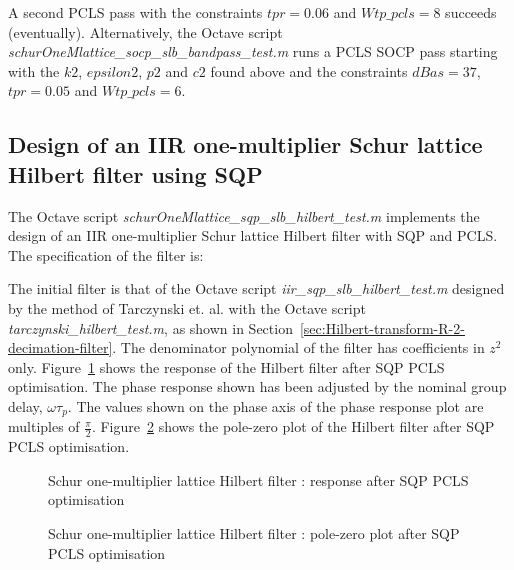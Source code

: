 \documentclass[a4paper,twoside,10pt,english]{report}
\begin{document}
A second PCLS pass with the constraints $tpr=0.06$ and $Wtp\_pcls=8$ succeeds 
(eventually). Alternatively, the Octave script  
\emph{schurOneMlattice\_socp\_slb\_bandpass\_test.m} runs a PCLS SOCP pass 
starting with the $k2$, $epsilon2$, $p2$ and $c2$ found above and the 
constraints $dBas=37$, $tpr=0.05$ and $Wtp\_pcls=6$.
\clearpage
\subsection{\label{sec:Design-IIR-one-multiplier-Schur-lattice-hilbert-SQP}Design of an IIR one-multiplier Schur lattice Hilbert filter using SQP}
The Octave script \emph{schurOneMlattice\_sqp\_slb\_hilbert\_test.m} implements
the design of an IIR one-multiplier Schur lattice Hilbert filter with SQP and 
PCLS. The specification of the filter is:
\begin{small}

\end{small}
The initial filter is that of the Octave script 
\emph{iir\_sqp\_slb\_hilbert\_test.m} designed by
the method of Tarczynski et. al. with the Octave script 
\emph{tarczynski\_hilbert\_test.m}, as shown in 
Section~\ref{sec:Hilbert-transform-R-2-decimation-filter}.
The denominator polynomial of the filter has coefficients in $z^{2}$ only.
Figure~\ref{fig:Schur-one-multiplier-lattice-hilbert-filter-SQP-PCLS} 
shows the response of the Hilbert filter after SQP PCLS optimisation. The phase
response shown has been adjusted by the nominal group delay, $\omega{}\tau_{p}$.
The values shown on the phase axis of the phase response plot are multiples of
$\frac{\pi}{2}$.
Figure~\ref{fig:Schur-one-multiplier-lattice-hilbert-filter-SQP-PCLS-pz} shows
the pole-zero plot of the Hilbert filter after SQP PCLS optimisation.
\begin{figure}[!htbp]
\begin{center}
\scalebox{0.7}{}
\caption{Schur one-multiplier lattice Hilbert filter : response after SQP PCLS optimisation}
\label{fig:Schur-one-multiplier-lattice-hilbert-filter-SQP-PCLS}
\end{center}
\end{figure}
\begin{figure}[!htbp]
\begin{center}
\scalebox{0.7}{}
\caption{Schur one-multiplier lattice Hilbert filter : pole-zero plot after SQP PCLS optimisation}
\label{fig:Schur-one-multiplier-lattice-hilbert-filter-SQP-PCLS-pz}
\end{center}
\end{figure}
\end{document}
